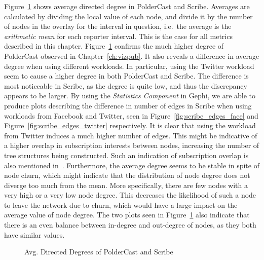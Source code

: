 Figure~\ref{fig:eval_directeddegree} shows average directed degree in
PolderCast and Scribe. Averages are calculated by dividing the local
value of each node, and divide it by the number of nodes in the overlay
for the interval in question, i.e.\ the average is the \emph{arithmetic
    mean} for each reporter interval. This is the case for all metrics
described in this chapter. Figure~\ref{fig:eval_directeddegree} confirms
the much higher degree of PolderCast observed in
Chapter~\ref{ch:vizpub}. It also reveals a difference in average degree
when using different workloads. In particular, using the Twitter
workload seem to cause a higher degree in both PolderCast and Scribe.
The difference is most noticeable in Scribe, as the degree is quite low,
and thus the discrepancy appears to be larger.
By using the \emph{Statistics Component} in Gephi, we are able to
produce plots describing the difference in number of edges in Scribe
when using workloads from Facebook and Twitter, seen
in Figure~\ref{fig:scribe_edges_face} and Figure~\ref{fig:scribe_edges_twitter}
respectively. It is clear that using the workload from Twitter induces a
much higher number of edges. This might be indicative of a higher
overlap in subscription interests between nodes, increasing the number
of tree structures being constructed. Such an indication of subscription
overlap is also mentioned in~\cite{Setty:2012}. Furthermore, the average
degree seems to be stable in spite of node churn, which might indicate
that the distribution of node degree does not diverge too much from the
mean. More specifically, there are few nodes with a very high or a very
low node degree. This decreases the likelihood of such a node to leave
the network due to churn, which would have a large impact on the average
value of node degree. The two plots seen in
Figure~\ref{fig:eval_directeddegree} also indicate that there is an even
balance between in-degree and out-degree of nodes, as they both have
similar values.

\begin{figure}[H]
    \centering
        
        \label{fig:eval_indegree}
        
        \label{fig:eval_outdegree}
    \caption{Avg. Directed Degrees of PolderCast and Scribe}
    \label{fig:eval_directeddegree}
\end{figure}



